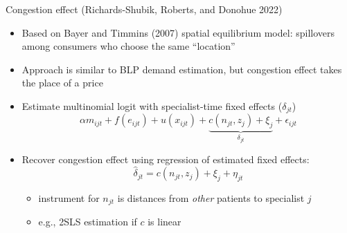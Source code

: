 \documentclass[slides, aspectratio=169]{beamer}
\newcommand{\bit}{\begin{itemize}}
\newcommand{\eit}{\end{itemize}}
\begin{document}
\begin{frame}{Congestion effect}
{(Richards-Shubik, Roberts, and Donohue 2022)} \label{congestion}
\begin{itemize}

\item Based on Bayer and Timmins (2007) spatial equilibrium model:
spillovers among consumers who choose the same ``location''

\item Approach is similar to BLP demand estimation,
but congestion effect takes the place of a price
\bigskip

\item Estimate multinomial logit with specialist-time fixed effects ($\delta_{jt}$) 
\[
\alpha m_{ijt} + f(e_{ijt}) + u(x_{ijt}) + \underbrace{ c(n_{jt}, z_j) + \xi_j }_{\delta_{jt}} + \epsilon_{ijt}
\]

\item Recover congestion effect using regression of estimated fixed effects:
\[
\hat \delta_{jt} = c(n_{jt}, z_j) + \xi_j + \eta_{jt}
\]
\vskip-4pt
\bit
    \item instrument for $n_{jt}$ is distances from \emph{other} patients to specialist $j$
    \item e.g., 2SLS estimation if $c$ is linear
\eit
\medskip

\hyperlink{utility specification}{}

\end{itemize}
\end{frame}

\end{document}

